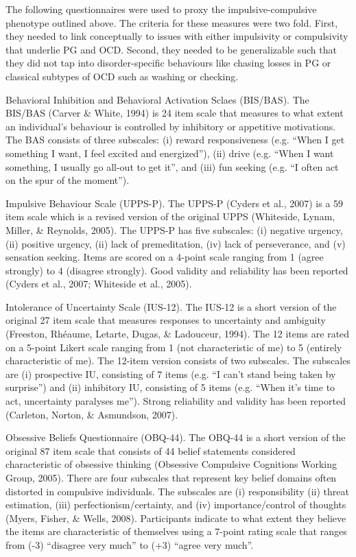 	The following questionnaires were used to proxy the impulsive-compulsive phenotype outlined above. The criteria for these measures were two fold. First, they needed to link conceptually to issues with either impulsivity or compulsivity that underlie PG and OCD. Second, they needed to be generalizable such that they did not tap into disorder-specific behaviours like chasing losses in PG or classical subtypes of OCD such as washing or checking.

	Behavioral Inhibition and Behavioral Activation Sclaes (BIS/BAS). The BIS/BAS (Carver & White, 1994) is 24 item scale that measures to what extent an individual’s behaviour is controlled by inhibitory or appetitive motivations. The BAS consists of three subscales: (i) reward responsiveness (e.g. “When I get something I want, I feel excited and energized”), (ii) drive (e.g. “When I want something, I usually go all-out to get it”, and (iii) fun seeking (e.g. “I often act on the spur of the moment”).

Impulsive Behaviour Scale (UPPS-P). The UPPS-P (Cyders et al., 2007) is a 59 item scale which is a revised version of the original UPPS (Whiteside, Lynam, Miller, & Reynolds, 2005).  The UPPS-P has five subscales: (i) negative urgency, (ii) positive urgency, (ii) lack of premeditation, (iv) lack of perseverance, and (v) sensation seeking. Items are scored on a 4-point scale ranging from 1 (agree strongly) to 4 (disagree strongly). Good validity and reliability has been reported (Cyders et al., 2007; Whiteside et al., 2005).

Intolerance of Uncertainty Scale (IUS-12). The IUS-12 is a short version of the original 27 item scale that measures responses to uncertainty and ambiguity (Freeston, Rhéaume, Letarte, Dugas, & Ladouceur, 1994).  The 12 items are rated on a 5-point Likert scale ranging from 1 (not characteristic of me) to 5 (entirely characteristic of me). The 12-item version consists of two subscales. The subscales are (i) prospective IU, consisting of 7 items (e.g. “I can’t stand being taken by surprise”) and (ii) inhibitory IU, consisting of 5 items (e.g. “When it’s time to act, uncertainty paralyses me”).  Strong reliability and validity has been reported (Carleton, Norton, & Asmundson, 2007).

Obsessive Beliefs Questionnaire (OBQ-44). The OBQ-44 is a short version of the original 87 item scale that consists of 44 belief statements considered characteristic of obsessive thinking (Obsessive Compulsive Cognitions Working Group, 2005). There are four subscales that represent key belief domains often distorted in compulsive individuals. The subscales are (i) responsibility (ii) threat estimation, (iii) perfectionism/certainty, and (iv) importance/control of thoughts (Myers, Fisher, & Wells, 2008). Participants indicate to what extent they believe the items are characteristic of themselves using a 7-point rating scale that ranges from (-3) “disagree very much” to (+3) “agree very much”.


